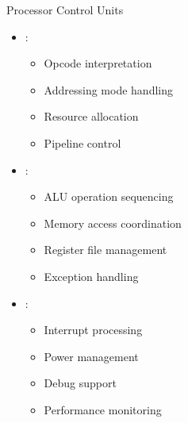 \begin{frame}{Processor Control Units}
\begin{itemize}
\item {}:
\begin{itemize}
\item Opcode interpretation
\item Addressing mode handling
\item Resource allocation
\item Pipeline control
\end{itemize}
\vspace{0.5cm}
\item {}:
\begin{itemize}
\item ALU operation sequencing
\item Memory access coordination
\item Register file management
\item Exception handling
\end{itemize}
\vspace{0.3cm}
\item {}:
\begin{itemize}
\item Interrupt processing
\item Power management
\item Debug support
\item Performance monitoring
\end{itemize}
\end{itemize}
\end{frame}

